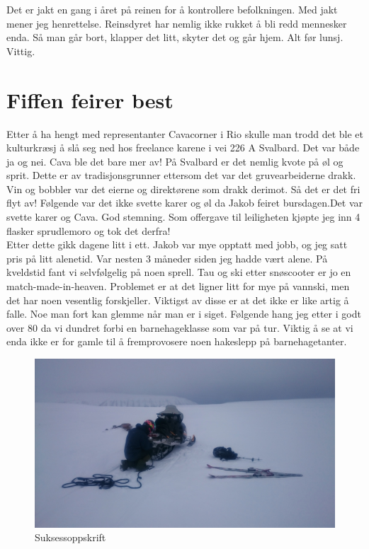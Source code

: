 Det er jakt en gang i året på reinen for å kontrollere befolkningen.
Med jakt mener jeg henrettelse. Reinsdyret har nemlig ikke rukket å
bli redd mennesker enda. Så man går bort, klapper det litt, skyter det
og går hjem. Alt før lunsj. Vittig.





\section{Fiffen feirer best}

Etter å ha hengt med representanter Cavacorner i Rio skulle man trodd
det ble et kulturkræsj å slå seg ned hos freelance karene i vei 226 A
Svalbard. Det var både ja og nei. Cava ble det bare mer av! På
Svalbard er det nemlig kvote på øl og sprit. Dette er av
tradisjonsgrunner ettersom det var det gruvearbeiderne drakk. Vin og
bobbler var det eierne og direktørene som drakk derimot. Så det er det
fri flyt av! Følgende var det ikke svette karer og øl da Jakob feiret
bursdagen.Det var svette karer og Cava. God stemning. Som offergave
til leiligheten kjøpte jeg inn 4 flasker sprudlemoro og tok det
derfra!\\


Etter dette gikk dagene litt i ett. Jakob var mye opptatt med jobb, og
jeg satt pris på litt alenetid. Var nesten 3 måneder siden jeg hadde
vært alene. På kveldstid fant vi selvfølgelig på noen sprell. Tau og
ski etter snøscooter er jo en match-made-in-heaven. Problemet er at
det ligner litt for mye på vannski, men det har noen vesentlig
forskjeller. Viktigst av disse er at det  ikke er like
artig å falle. Noe man fort kan glemme når man er i siget. Følgende
hang jeg etter i godt over 80 da vi dundret forbi en
barnehageklasse som var på tur. Viktig å se at vi enda ikke er for
gamle til å fremprovosere noen hakeslepp på barnehagetanter.\\
\begin{figure}[]
	\centering
	\includegraphics[width=\textwidth]{Scooterogski}
	\caption*{Suksessoppskrift}
\label{fig:trollsteinen}
\end{figure}

